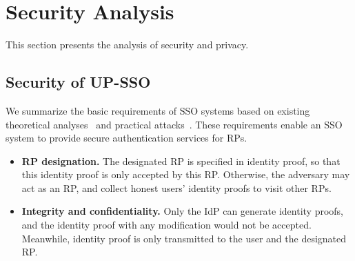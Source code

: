 \section{Security Analysis}
\label{sec:analysis}
This section presents the analysis of security and privacy. 

\subsection{Security of UP-SSO}
We summarize the basic requirements of SSO systems based on existing theoretical analyses~\cite{ArmandoCCCT08,FettKS16, FettKS17} and practical attacks~\cite{SomorovskyMSKJ12,WangCW12,ArmandoCCCPS13,WangZLG16,MainkaMS16,MainkaMSW17}. These requirements enable an SSO system to provide secure authentication services for RPs.
\begin{itemize}

\item
\textbf{RP designation.} The designated RP is specified in identity proof,
    so that this identity proof is  only accepted by this RP.
Otherwise, the adversary may act as an RP, and collect honest users' identity proofs to visit other RPs.

\item
\textbf{Integrity and confidentiality.}
 Only the IdP can generate identity proofs,
and the identity proof with any modification would not be accepted.
Meanwhile, identity proof is only transmitted to the user and the designated RP.
\end{itemize}


